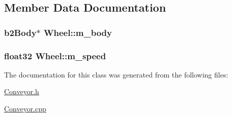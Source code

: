 \subsection{Member Data Documentation}
\hypertarget{classWheel_a025dd350776aa44dee750864bb9918f2}{
\subsubsection[{m\-\_\-body}]{\setlength{\rightskip}{0pt plus 5cm}b2\-Body$\ast$ Wheel\-::m\-\_\-body\hspace{0.3cm}{\ttfamily [private]}}}\label{classWheel_a025dd350776aa44dee750864bb9918f2}
\hypertarget{classWheel_afff232bc89f91dfcf8a15be2a7af0307}{
\subsubsection[{m\-\_\-speed}]{\setlength{\rightskip}{0pt plus 5cm}float32 Wheel\-::m\-\_\-speed\hspace{0.3cm}{\ttfamily [private]}}}\label{classWheel_afff232bc89f91dfcf8a15be2a7af0307}


The documentation for this class was generated from the following files\-:\begin{DoxyCompactItemize}
\item 
\hyperlink{Conveyor_8h}{Conveyor.\-h}\item 
\hyperlink{Conveyor_8cpp}{Conveyor.\-cpp}\end{DoxyCompactItemize}
